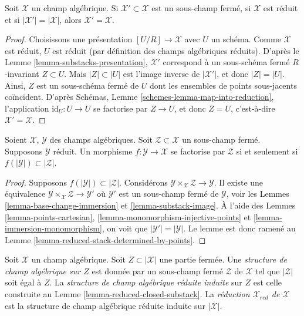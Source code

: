 \begin{lemma}
\label{lemma-reduced-stack-determined-by-points}
Soit $\mathcal{X}$ un champ algébrique.
Si $\mathcal{X}' \subset \mathcal{X}$
est un sous-champ fermé, si $\mathcal{X}$ est réduit et si
$|\mathcal{X}'| = |\mathcal{X}|$, alors $\mathcal{X}' = \mathcal{X}$.
\end{lemma}

\begin{proof}
Choisissons une présentation $[U/R] \to \mathcal{X}$ avec $U$ un schéma.
Comme $\mathcal{X}$ est réduit, $U$ est réduit (par définition
des champs algébriques réduits). D'après le
Lemme \ref{lemma-substacks-presentation},
$\mathcal{X}'$ correspond à un sous-schéma fermé $R$-invariant $Z \subset U$.
Mais $|Z| \subset |U|$ est l'image inverse de $|\mathcal{X}'|$, et
donc $|Z| = |U|$. Ainsi, $Z$ est un sous-schéma fermé de $U$ dont les ensembles
de points sous-jacents coïncident. D'après
Schémas, Lemme \ref{schemes-lemma-map-into-reduction},
l'application $\text{id}_U : U \to U$ se factorise par $Z \to U$, et donc
$Z = U$, c'est-à-dire $\mathcal{X}' = \mathcal{X}$.
\end{proof}

\begin{lemma}
\label{lemma-map-into-reduction}
Soient $\mathcal{X}$, $\mathcal{Y}$ des champs algébriques.
Soit $\mathcal{Z} \subset \mathcal{X}$ un sous-champ fermé.
Supposons $\mathcal{Y}$ réduit.
Un morphisme $f : \mathcal{Y} \to \mathcal{X}$ se factorise par
$\mathcal{Z}$ si et seulement si
$f(|\mathcal{Y}|) \subset |\mathcal{Z}|$.
\end{lemma}

\begin{proof}
Supposons $f(|\mathcal{Y}|) \subset |\mathcal{Z}|$. Considérons
$\mathcal{Y} \times_\mathcal{X} \mathcal{Z} \to \mathcal{Y}$.
Il existe une équivalence
$\mathcal{Y} \times_\mathcal{X} \mathcal{Z} \to \mathcal{Y}'$
où $\mathcal{Y}'$ est un sous-champ fermé de $\mathcal{Y}$, voir les
Lemmes \ref{lemma-base-change-immersion} et
\ref{lemma-substack-image}.
À l'aide des
Lemmes \ref{lemma-points-cartesian},
\ref{lemma-monomorphism-injective-points} et
\ref{lemma-immersion-monomorphism},
on voit que $|\mathcal{Y}'| = |\mathcal{Y}|$. Le lemme est donc ramené au
Lemme \ref{lemma-reduced-stack-determined-by-points}.
\end{proof}

\begin{definition}
\label{definition-reduced-induced-stack}
Soit $\mathcal{X}$ un champ algébrique.
Soit $Z \subset |\mathcal{X}|$ une partie fermée.
Une {\it structure de champ algébrique sur $Z$} est donnée par un sous-champ fermé
$\mathcal{Z}$ de $\mathcal{X}$ tel que $|\mathcal{Z}|$ soit égal à $Z$.
La {\it structure de champ algébrique réduite induite}
sur $Z$ est celle construite au
Lemme \ref{lemma-reduced-closed-substack}.
La {\it réduction $\mathcal{X}_{red}$ de $\mathcal{X}$}
est la structure de champ algébrique réduite induite sur $|\mathcal{X}|$.
\end{definition}


